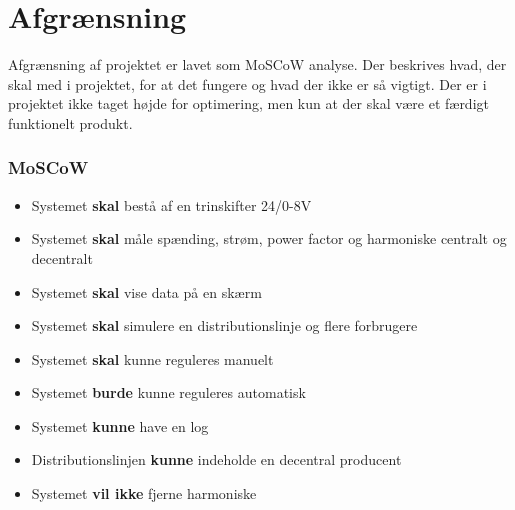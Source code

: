

\section{Afgrænsning}
Afgrænsning af projektet er lavet som MoSCoW analyse. Der beskrives hvad, der skal med i projektet, for at det fungere og hvad der ikke er så vigtigt. Der er i projektet ikke taget højde for optimering, men kun at der skal være et færdigt funktionelt produkt.
\subsubsection{MoSCoW}

\begin{itemize}
	\item{Systemet \textbf{skal} bestå af en trinskifter 24/0-8V}
	\item{Systemet \textbf{skal} måle spænding, strøm, power factor og harmoniske centralt og decentralt}
	\item{Systemet \textbf{skal} vise data på en skærm}
	\item{Systemet \textbf{skal} simulere en distributionslinje og flere forbrugere}
	\item{Systemet \textbf{skal} kunne reguleres manuelt}
	\item{Systemet \textbf{burde} kunne reguleres automatisk}
	\item{Systemet \textbf{kunne} have en log}
	\item{Distributionslinjen \textbf{kunne} indeholde en decentral producent}
	\item{Systemet \textbf{vil ikke} fjerne harmoniske} 
\end{itemize}	
